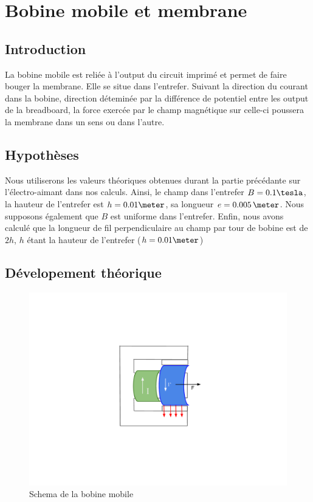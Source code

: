 \chapter{Bobine mobile et membrane}
\section{Introduction}
La bobine mobile est reliée à l'output du circuit imprimé et permet de faire bouger la membrane. Elle se situe dans 
l'entrefer. Suivant la direction du courant dans la bobine, direction déteminée par la différence de potentiel
entre les output de la breadboard, la force exercée par le champ magnétique sur celle-ci poussera la 
membrane dans un sens ou dans l'autre.

\section{Hypothèses}
Nous utiliserons les valeurs théoriques obtenues durant la partie précédante sur l'électro-aimant dans nos calculs.
Ainsi, le champ dans l'entrefer $B = 0.1\tesla$, la hauteur de l'entrefer est $h = 0.01\meter$, sa longueur 
$e = 0.005\,\meter$. Nous supposons également que $B$ est uniforme dans l'entrefer. Enfin, nous avons 
calculé que la longueur de fil perpendiculaire au champ par tour de bobine est de $2h$, $h$ étant 
la hauteur de l'entrefer ($h = 0.01\meter$) 

\section{Dévelopement théorique}

\begin{figure}	
\begin{center}
\includegraphics[scale=0.7]{img/bobine-mobile}
\end{center}
\caption{Schema de la bobine mobile}		
\label{fig:bobinemobile}		
\end{figure}


